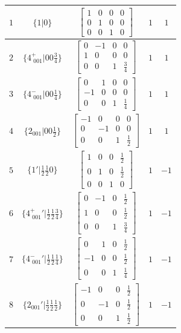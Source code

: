 \documentclass[fleqn,8pt]{jsarticle}
\begin{document}
\begin{longtable}{ccccc}
$ 1 $ & $ \{1|0\} $ & $ \begin{bmatrix} 1 & 0 & 0 & 0 \\ 0 & 1 & 0 & 0 \\ 0 & 0 & 1 & 0 \end{bmatrix} $ & $ 1 $ & $ 1 $ \\ \hline
$ 2 $ & $ \{4^{+}_{\,\,001}|0 0 \frac{3}{4}\} $ & $ \begin{bmatrix} 0 & -1 & 0 & 0 \\ 1 & 0 & 0 & 0 \\ 0 & 0 & 1 & \frac{3}{4} \end{bmatrix} $ & $ 1 $ & $ 1 $ \\ \hline
$ 3 $ & $ \{4^{-}_{\,\,001}|0 0 \frac{1}{4}\} $ & $ \begin{bmatrix} 0 & 1 & 0 & 0 \\ -1 & 0 & 0 & 0 \\ 0 & 0 & 1 & \frac{1}{4} \end{bmatrix} $ & $ 1 $ & $ 1 $ \\ \hline
$ 4 $ & $ \{2{}_{001}|0 0 \frac{1}{2}\} $ & $ \begin{bmatrix} -1 & 0 & 0 & 0 \\ 0 & -1 & 0 & 0 \\ 0 & 0 & 1 & \frac{1}{2} \end{bmatrix} $ & $ 1 $ & $ 1 $ \\ \hline
$ 5 $ & $ \{1{}'|\frac{1}{2} \frac{1}{2} 0\} $ & $ \begin{bmatrix} 1 & 0 & 0 & \frac{1}{2} \\ 0 & 1 & 0 & \frac{1}{2} \\ 0 & 0 & 1 & 0 \end{bmatrix} $ & $ 1 $ & $ -1 $ \\ \hline
$ 6 $ & $ \{4^{+}_{\,\,001}{}'|\frac{1}{2} \frac{1}{2} \frac{3}{4}\} $ & $ \begin{bmatrix} 0 & -1 & 0 & \frac{1}{2} \\ 1 & 0 & 0 & \frac{1}{2} \\ 0 & 0 & 1 & \frac{3}{4} \end{bmatrix} $ & $ 1 $ & $ -1 $ \\ \hline
$ 7 $ & $ \{4^{-}_{\,\,001}{}'|\frac{1}{2} \frac{1}{2} \frac{1}{4}\} $ & $ \begin{bmatrix} 0 & 1 & 0 & \frac{1}{2} \\ -1 & 0 & 0 & \frac{1}{2} \\ 0 & 0 & 1 & \frac{1}{4} \end{bmatrix} $ & $ 1 $ & $ -1 $ \\ \hline
$ 8 $ & $ \{2{}_{001}{}'|\frac{1}{2} \frac{1}{2} \frac{1}{2}\} $ & $ \begin{bmatrix} -1 & 0 & 0 & \frac{1}{2} \\ 0 & -1 & 0 & \frac{1}{2} \\ 0 & 0 & 1 & \frac{1}{2} \end{bmatrix} $ & $ 1 $ & $ -1 $ \\
\end{longtable}
\end{document}
